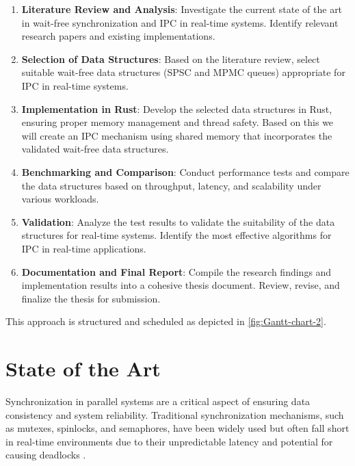 \documentclass[ a4paper,
                toc=bibliography
              ]{scrartcl}
\begin{document}
\begin{enumerate}
	\item \textbf{Literature Review and Analysis}: Investigate the current state of the art in wait-free synchronization and IPC in real-time systems. Identify relevant research papers and existing implementations.
	
	\item \textbf{Selection of Data Structures}: Based on the literature review, select suitable wait-free data structures (SPSC and MPMC queues) appropriate for IPC in real-time systems.
	
	\item \textbf{Implementation in Rust}: Develop the selected data structures in Rust, ensuring proper memory management and thread safety. Based on this we will create an IPC mechanism using shared memory that incorporates the validated wait-free data structures.
	
	\item \textbf{Benchmarking and Comparison}: Conduct performance tests and compare the data structures based on throughput, latency, and scalability under various workloads.
	
	\item \textbf{Validation}: Analyze the test results to validate the suitability of the data structures for real-time systems. Identify the most effective algorithms for IPC in real-time applications.
	
	\item \textbf{Documentation and Final Report}: Compile the research findings and implementation results into a cohesive thesis document. Review, revise, and finalize the thesis for submission.
\end{enumerate}

This approach is structured and scheduled as depicted in \autoref{fig:Gantt-chart-2}.

\section{State of the Art}

Synchronization in parallel systems are a critical aspect of ensuring data consistency and system reliability. Traditional synchronization mechanisms, such as mutexes, spinlocks, and semaphores, have been widely used but often fall short in real-time environments due to their unpredictable latency and potential for causing deadlocks \cite{herlihy1991wait, herlihy2012art}.
\end{document}
